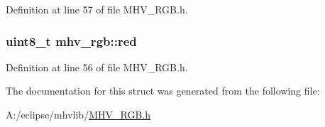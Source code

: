 \-Definition at line 57 of file \-M\-H\-V\-\_\-\-R\-G\-B.\-h.

\hypertarget{structmhv__rgb_a0f10bc24930951dba3e243614179d493}{
\subsubsection[{red}]{\setlength{\rightskip}{0pt plus 5cm}uint8\-\_\-t {\bf mhv\-\_\-rgb\-::red}}}
\label{structmhv__rgb_a0f10bc24930951dba3e243614179d493}


\-Definition at line 56 of file \-M\-H\-V\-\_\-\-R\-G\-B.\-h.



\-The documentation for this struct was generated from the following file\-:\begin{DoxyCompactItemize}
\item 
\-A\-:/eclipse/mhvlib/\hyperlink{_m_h_v___r_g_b_8h}{\-M\-H\-V\-\_\-\-R\-G\-B.\-h}\end{DoxyCompactItemize}
